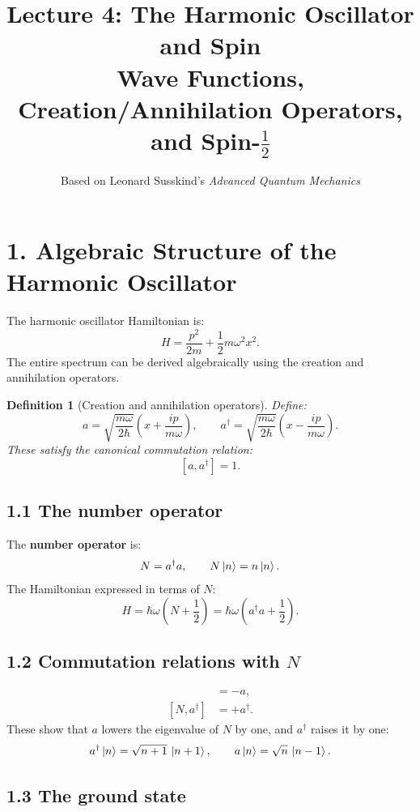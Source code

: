 \documentclass[12pt,a4paper]{article}
\title{\textbf{Lecture 4: The Harmonic Oscillator and Spin} \\ \large Wave Functions, Creation/Annihilation Operators, and Spin-$\frac{1}{2}$}
\author{Based on Leonard Susskind's \textit{Advanced Quantum Mechanics}}
\date{}
\newtheorem{definition}{Definition}
\begin{document}
\maketitle
\thispagestyle{fancy}

\section{1. Algebraic Structure of the Harmonic Oscillator}

The harmonic oscillator Hamiltonian is:
\[
    H = \frac{p^2}{2m} + \frac{1}{2}m\omega^2 x^2.
\]
The entire spectrum can be derived algebraically using the creation and annihilation operators.

\begin{definition}[Creation and annihilation operators]
Define:
\[
    a = \sqrt{\frac{m\omega}{2\hbar}}\left(x + \frac{ip}{m\omega}\right), \qquad
    a^\dagger = \sqrt{\frac{m\omega}{2\hbar}}\left(x - \frac{ip}{m\omega}\right).
\]
These satisfy the canonical commutation relation:
\[
    [a, a^\dagger] = 1.
\]
\end{definition}

\subsection{1.1 The number operator}

The \textbf{number operator} is:
\[
    N = a^\dagger a, \qquad N\ket{n} = n\ket{n}.
\]
The Hamiltonian expressed in terms of $N$:
\[
    H = \hbar\omega\left(N + \frac{1}{2}\right) = \hbar\omega\left(a^\dagger a + \frac{1}{2}\right).
\]

\subsection{1.2 Commutation relations with $N$}

\begin{align}
    [N, a] &= -a, \\
    [N, a^\dagger] &= +a^\dagger.
\end{align}
These show that $a$ lowers the eigenvalue of $N$ by one, and $a^\dagger$ raises it by one:
\[
    a^\dagger\ket{n} = \sqrt{n+1}\,\ket{n+1}, \qquad a\ket{n} = \sqrt{n}\,\ket{n-1}.
\]

\subsection{1.3 The ground state}
\end{document}
